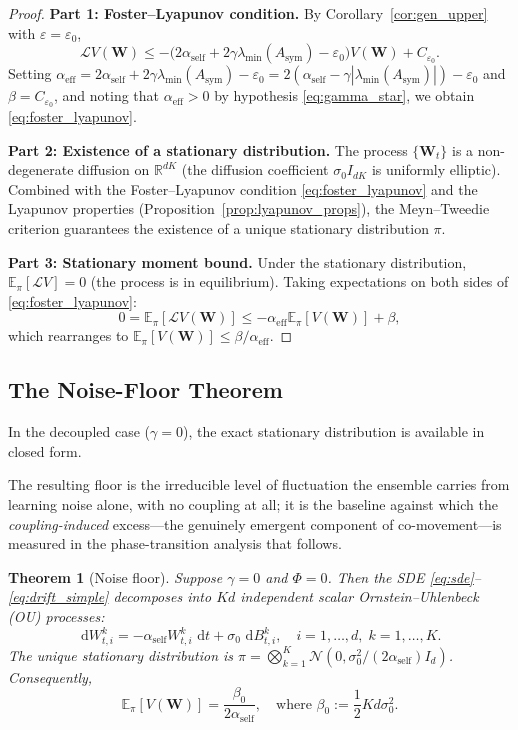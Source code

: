 \documentclass[12pt]{article}
\theoremstyle{plain}
\newtheorem{theorem}{Theorem}[section]
\theoremstyle{definition}
\newcommand{\R}{\mathbb{R}}
\newcommand{\E}{\mathbb{E}}
\newcommand{\Lgen}{\mathcal{L}}
\newcommand{\W}{\mathbf{W}}
\newcommand{\abs}[1]{\left| #1 \right|}
\newcommand{\dif}{\,\mathrm{d}}
\begin{document}
\begin{proof}
  \textbf{Part 1: Foster--Lyapunov condition.}
  By Corollary~\ref{cor:gen_upper} with $\varepsilon = \varepsilon_0$,
  \[
    \Lgen V(\W) \leq
    -\bigl(2\alpha_{\mathrm{self}} + 2\gamma \lambda_{\min}(A_{\mathrm{sym}})
    - \varepsilon_0\bigr) V(\W) + C_{\varepsilon_0}.
  \]
  Setting $\alpha_{\mathrm{eff}} = 2\alpha_{\mathrm{self}}
  + 2\gamma\lambda_{\min}(A_{\mathrm{sym}}) - \varepsilon_0
  = 2(\alpha_{\mathrm{self}} - \gamma\abs{\lambda_{\min}(A_{\mathrm{sym}})}) - \varepsilon_0$ and
  $\beta = C_{\varepsilon_0}$, and noting that $\alpha_{\mathrm{eff}} > 0$
  by hypothesis \eqref{eq:gamma_star}, we obtain
  \eqref{eq:foster_lyapunov}.

  \textbf{Part 2: Existence of a stationary distribution.}
  The process $\{\W_t\}$ is a non-degenerate diffusion on $\R^{dK}$
  (the diffusion coefficient $\sigma_0 I_{dK}$ is uniformly elliptic).
  Combined with the Foster--Lyapunov condition
  \eqref{eq:foster_lyapunov} and the Lyapunov properties
  (Proposition~\ref{prop:lyapunov_props}), the Meyn--Tweedie criterion
  \cite{meyn1993stability} guarantees the existence of a unique
  stationary distribution $\pi$.

  \textbf{Part 3: Stationary moment bound.}
  Under the stationary distribution, $\E_\pi[\Lgen V] = 0$ (the
  process is in equilibrium).  Taking expectations on both sides of
  \eqref{eq:foster_lyapunov}:
  \[
    0 = \E_\pi[\Lgen V(\W)] \leq
    -\alpha_{\mathrm{eff}} \E_\pi[V(\W)] + \beta,
  \]
  which rearranges to $\E_\pi[V(\W)] \leq \beta / \alpha_{\mathrm{eff}}$.
\end{proof}

\subsection{The Noise-Floor Theorem}

In the decoupled case ($\gamma = 0$), the exact stationary distribution
is available in closed form.

The resulting floor is the irreducible level of fluctuation the ensemble carries from learning noise alone, with no coupling at all; it is the baseline against which the \emph{coupling-induced} excess---the genuinely emergent component of co-movement---is measured in the phase-transition analysis that follows.

\begin{theorem}[Noise floor]
  \label{thm:noise_floor}
  Suppose $\gamma = 0$ and $\Phi = 0$.  Then the SDE
  \eqref{eq:sde}--\eqref{eq:drift_simple} decomposes into $Kd$
  independent scalar Ornstein--Uhlenbeck (OU) processes:
  \[
    \dif W^k_{t,i} = -\alpha_{\mathrm{self}} W^k_{t,i}\,\dif t
    + \sigma_0\,\dif B^k_{t,i}, \quad i=1,\ldots,d,\; k=1,\ldots,K.
  \]
  The unique stationary distribution is
  $\pi = \bigotimes_{k=1}^K \mathcal{N}(0, \sigma_0^2/(2\alpha_{\mathrm{self}}) I_d)$.
  Consequently,
  \begin{equation}
    \E_\pi[V(\W)] = \frac{\beta_0}{2\alpha_{\mathrm{self}}},
    \quad \text{where } \beta_0 := \frac{1}{2}Kd\sigma_0^2.
    \label{eq:noise_floor}
  \end{equation}
\end{theorem}
\end{document}
